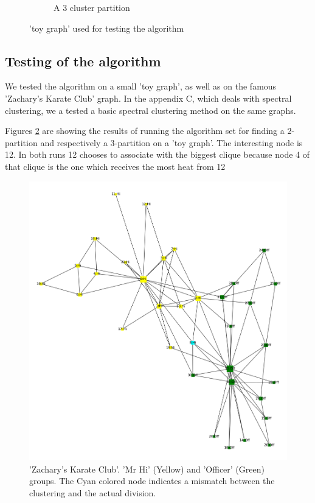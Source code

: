 \begin{figure}
\begin{framed}
\begin{subfigure}[b]{0.5\textwidth}
\caption{A 3 cluster partition}
\label{fig:examplecoolwarm3cluster}
\end{subfigure}
\caption{'toy graph' used for testing the algorithm}
\label{fig:exampleCoolWarmClustering}
\end{framed}
\end{figure}

\subsection*{Testing of the algorithm}

We tested the algorithm on a small 'toy graph', as well as on the
famous 'Zachary's Karate Club' graph. In the appendix C, which deals
with spectral clustering, we a tested a basic spectral clustering 
method on the same graphs.

Figures \ref{fig:exampleCoolWarmClustering} are showing the results
of running the algorithm set for finding a 2-partition and
respectively a 3-partition on a 'toy graph'. The interesting node is
12. In both runs 12 chooses to associate with the biggest clique
because node 4 of that clique is the one which receives the most
heat from 12

\begin{figure}[!htb]
\begin{framed}
\centering
\includegraphics[width=0.97\linewidth]{figures/Karate_coolwarmclustering.png}
\caption{
'Zachary's Karate Club'.
'Mr Hi' (Yellow) and 'Officer' (Green) groups.
The Cyan colored node indicates a mismatch between the clustering
and the actual division.
}
\label{fig:karatecoolwarm}
\end{framed}
\end{figure}

